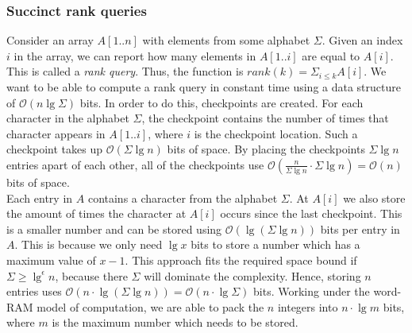 \subsubsection{Succinct rank queries}
\label{sssect:succintrank}
Consider an array $A[1..n]$ with elements from some alphabet $\Sigma$. Given an index $i$ in the array, we can report how many elements in $A[1..i]$ are equal to $A[i]$. This is called a \emph{rank query}. Thus, the function is $rank(k) = \Sigma_{i\leq k} A[i]$. We want to be able to compute a rank query in constant time using a data structure of $\mathcal{O}(n \lg \Sigma)$ bits. In order to do this, checkpoints are created. For each character in the alphabet $\Sigma$, the checkpoint contains the number of times that character appears in $A[1..i]$, where $i$ is the checkpoint location. Such a checkpoint takes up $\mathcal{O}(\Sigma \lg n)$ bits of space. By placing the checkpoints $\Sigma \lg n$ entries apart of each other, all of the checkpoints use $\mathcal{O}(\frac{n}{\Sigma \lg n} \cdot \Sigma \lg n) = \mathcal{O}(n)$ bits of space.\\ 

Each entry in $A$ contains a character from the alphabet $\Sigma$. At $A[i]$ we also store the amount of times the character at $A[i]$ occurs since the last checkpoint. This is a smaller number and can be stored using $\mathcal{O}(\lg (\Sigma \lg n))$ bits per entry in $A$. This is because we only need $\lg x$ bits to store a number which has a maximum value of $x-1$. This approach fits the required space bound if $\Sigma \geq \lg^\epsilon n$, because there $\Sigma$ will dominate the complexity. Hence, storing $n$ entries uses $\mathcal{O}(n\cdot\lg(\Sigma \lg n)) = \mathcal{O}(n\cdot\lg\Sigma)$ bits. Working under the word-RAM model of computation, we are able to pack the $n$ integers into $n\cdot\lg m$ bits, where $m$ is the maximum number which needs to be stored.


